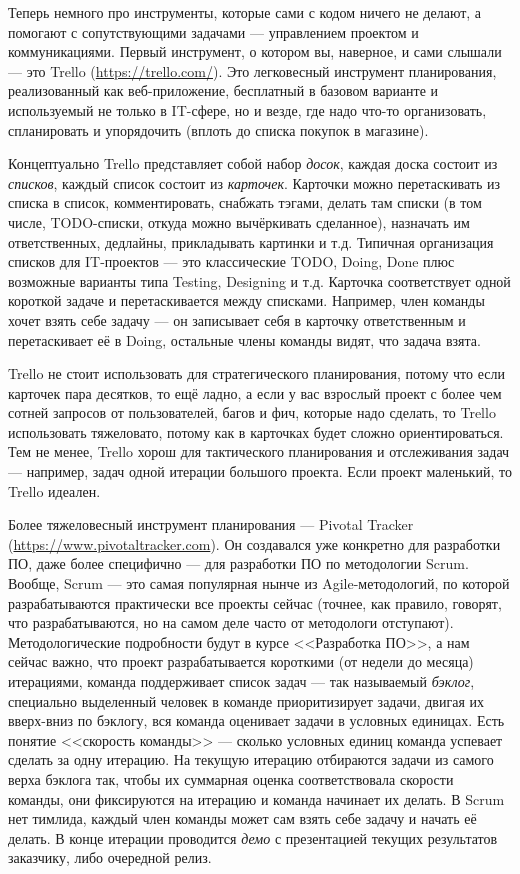 \documentclass[a5paper]{article}
\begin{document}
Теперь немного про инструменты, которые сами с кодом ничего не делают, а помогают с сопутствующими задачами --- управлением проектом и коммуникациями. Первый инструмент, о котором вы, наверное, и сами слышали --- это Trello (\url{https://trello.com/}). Это легковесный инструмент планирования, реализованный как веб-приложение, бесплатный в базовом варианте и используемый не только в IT-сфере, но и везде, где надо что-то организовать, спланировать и упорядочить (вплоть до списка покупок в магазине).

Концептуально Trello представляет собой набор \textit{досок}, каждая доска состоит из \textit{списков}, каждый список состоит из \textit{карточек}. Карточки можно перетаскивать из списка в список, комментировать, снабжать тэгами, делать там списки (в том числе, TODO-списки, откуда можно вычёркивать сделанное), назначать им ответственных, дедлайны, прикладывать картинки и т.д. Типичная организация списков для IT-проектов --- это классические TODO, Doing, Done плюс возможные варианты типа Testing, Designing и т.д. Карточка соответствует одной короткой задаче и перетаскивается между списками. Например, член команды хочет взять себе задачу --- он записывает себя в карточку ответственным и перетаскивает её в Doing, остальные члены команды видят, что задача взята.

Trello не стоит использовать для стратегического планирования, потому что если карточек пара десятков, то ещё ладно, а если у вас взрослый проект с более чем сотней запросов от пользователей, багов и фич, которые надо сделать, то Trello использовать тяжеловато, потому как в карточках будет сложно ориентироваться. Тем не менее, Trello хорош для тактического планирования и отслеживания задач --- например, задач одной итерации большого проекта. Если проект маленький, то Trello идеален.

Более тяжеловесный инструмент планирования --- Pivotal Tracker (\url{https://www.pivotaltracker.com}). Он создавался уже конкретно для разработки ПО, даже более специфично --- для разработки ПО по методологии Scrum. Вообще, Scrum --- это самая популярная нынче из Agile-методологий, по которой разрабатываются практически все проекты сейчас (точнее, как правило, говорят, что разрабатываются, но на самом деле часто от методологи отступают). Методологические подробности будут в курсе <<Разработка ПО>>, а нам сейчас важно, что проект разрабатывается короткими (от недели до месяца) итерациями, команда поддерживает список задач --- так называемый \textit{бэклог}, специально выделенный человек в команде приоритизирует задачи, двигая их вверх-вниз по бэклогу, вся команда оценивает задачи в условных единицах. Есть понятие <<скорость команды>> --- сколько условных единиц команда успевает сделать за одну итерацию. На текущую итерацию отбираются задачи из самого верха бэклога так, чтобы их суммарная оценка соответствовала скорости команды, они фиксируются на итерацию и команда начинает их делать. В Scrum нет тимлида, каждый член команды может сам взять себе задачу и начать её делать. В конце итерации проводится \textit{демо} с презентацией текущих результатов заказчику, либо очередной релиз.
\end{document}
